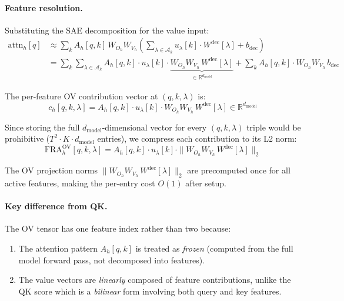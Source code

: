 \documentclass{article}
\theoremstyle{plain}
\theoremstyle{definition}
\theoremstyle{remark}
\newcommand{\Wdec}{W^{\mathrm{dec}}}
\newcommand{\dmodel}{d_{\mathrm{model}}}
\newcommand{\ulambda}{u_\lambda}
\newcommand{\RR}{\mathbb{R}}
\begin{document}
\paragraph{Feature resolution.} Substituting the SAE decomposition for the value input:
\begin{align}
    \mathrm{attn}_h[q] &\approx \sum_k A_h[q,k] \, W_{O_h} W_{V_h} \left( \sum_{\lambda \in \mathcal{A}_k} \ulambda[k] \cdot \Wdec[\lambda] + b_{\mathrm{dec}} \right) \\
    &= \sum_k \sum_{\lambda \in \mathcal{A}_k} A_h[q,k] \cdot \ulambda[k] \cdot \underbrace{W_{O_h} W_{V_h}\, \Wdec[\lambda]}_{\in \RR^{\dmodel}} + \sum_k A_h[q,k] \cdot W_{O_h} W_{V_h}\, b_{\mathrm{dec}}
\end{align}

The per-feature OV contribution vector at $(q, k, \lambda)$ is:
\begin{equation}
    c_h[q, k, \lambda] = A_h[q,k] \cdot \ulambda[k] \cdot W_{O_h} W_{V_h}\, \Wdec[\lambda] \in \RR^{\dmodel}
\end{equation}

Since storing the full $\dmodel$-dimensional vector for every $(q,k,\lambda)$ triple would be prohibitive ($T^2 \cdot K \cdot \dmodel$ entries), we compress each contribution to its L2 norm:
\begin{equation}
    \mathrm{FRA}^{\mathrm{OV}}_h[q,k,\lambda] = A_h[q,k] \cdot \ulambda[k] \cdot \|W_{O_h} W_{V_h}\, \Wdec[\lambda]\|_2
\end{equation}

The OV projection norms $\|W_{O_h} W_{V_h}\, \Wdec[\lambda]\|_2$ are precomputed once for all active features, making the per-entry cost $O(1)$ after setup.

\paragraph{Key difference from QK.} The OV tensor has one feature index rather than two because:
\begin{enumerate}
    \item The attention pattern $A_h[q,k]$ is treated as \emph{frozen} (computed from the full model forward pass, not decomposed into features).
    \item The value vectors are \emph{linearly} composed of feature contributions, unlike the QK score which is a \emph{bilinear} form involving both query and key features.
\end{enumerate}
\end{document}
